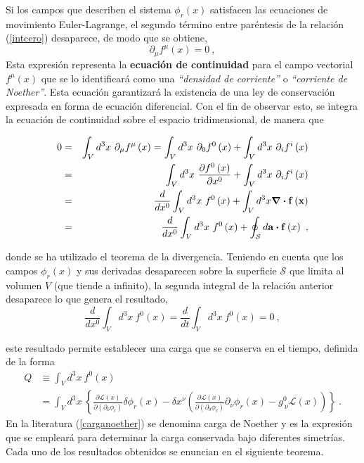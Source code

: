 \noindent
Si los campos que describen el sistema $\phi_{r}(x)$ satisfacen las ecuaciones de movimiento Euler-Lagrange, el segundo término entre paréntesis de la relación (\ref{intcero}) desaparece, de modo que se obtiene,
\begin{equation}
\boxed{
    \partial_{\mu}f^{\mu}(x)=0~,
    }
\end{equation}
\noindent
Esta expresión representa la \textbf{ecuación de continuidad} para el campo vectorial $f^{\mu}(x)$ que se lo identificará como una \emph{``densidad de corriente''} o \emph{``corriente de Noether''}. Esta ecuación garantizará la existencia de una ley de conservación expresada en forma de ecuación diferencial. Con el fin de observar esto, se integra la ecuación de continuidad sobre el espacio tridimensional, de manera que 

\begin{eqnarray*}
0 &=&\int_{V}d^{3}x~\partial _{\mu }f^{\mu }\left( x\right)
=\int_{V}d^{3}x~\partial _{0}f^{0}\left( x\right) +\int_{V}d^{3}x~\partial_{i}f^{i}\left( x\right)  \\
&=&\int_{V}d^{3}x~\frac{\partial f^{0}\left( x\right) }{\partial x^{0}}+\int_{V}d^{3}x~\partial _{i}f^{i}\left( x\right)  \\
&=&\frac{d}{dx^{0}}\int_{V}d^{3}x~f^{0}\left( x\right) +\int_{V}d^{3}x\div{\vb{f\left( x\right)}}  \\
&=&\frac{d}{dx^{0}}\int_{V}d^{3}x~f^{0}\left( x\right) +\oint_{\mathcal{S}}d\vb{a}\vdot\vb{f}\left(x\right) ~,
\end{eqnarray*}

\noindent
donde se ha utilizado el teorema de la divergencia. Teniendo en cuenta que los campos $\phi_{r}(x)$ y sus derivadas desaparecen sobre la superficie $\mathcal{S}$ que limita al volumen $V$ (que tiende a infinito), la segunda integral de la relación anterior desaparece lo que genera el resultado,
\begin{equation*}
    \frac{d}{dx^{0}}\int_{V}d^{3}x~f^{0}\left( x\right)=\frac{d}{dt}\int_{V}d^{3}x~f^{0}\left( x\right)=0~,
\end{equation*}

\noindent
este resultado permite establecer una carga que se conserva en el tiempo, definida de la forma 
\begin{equation}
\begin{split}
    Q &\equiv \int_{V}d^{3}x~f^{0}\left( x\right) \\ 
    &=\int_{V}d^{3}x~\left\{ \frac{\partial \mathcal{L}\left( x\right) }{\partial \left( \partial _{0 }\phi_{r}\right) }\delta \phi _{r}(x)-\delta x^{\nu }\left( \frac{\partial \mathcal{L}\left( x\right) }{\partial \left( \partial _{0}\phi _{r}\right) } \partial _{\nu }\phi _{r}\left( x\right) -g_{~\nu }^{0 }\mathcal{L}\left(x\right) \right)\right\}~.
    \label{carganoether}
\end{split}
\end{equation}
\noindent
En la literatura (\ref{carganoether}) se denomina carga de Noether y es la expresión que se empleará para determinar la carga conservada bajo diferentes simetrías. Cada uno de los resultados obtenidos se enuncian en el siguiente teorema.


